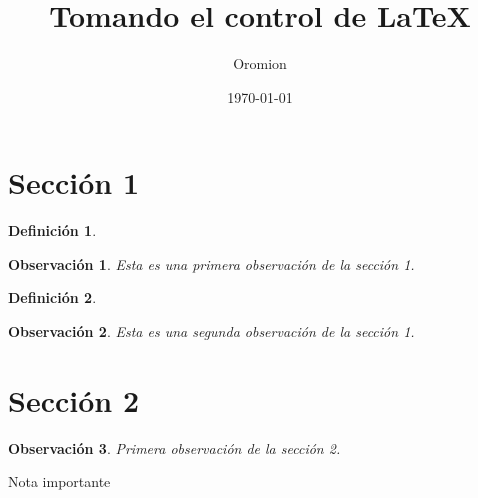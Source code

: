 \documentclass{article}
\title{Tomando el control de \LaTeX{}}
\author{Oromion}
\date{\today}
\newtheorem{definicion}{Definición}
\newtheorem{obs}{Observación}[section] %
\begin{document}
\maketitle

\section{Sección 1}

\lipsum[1]

\begin{definicion}
\lipsum[1]
\end{definicion}

\begin{obs}
Esta es una primera observación de la sección 1.
\end{obs}

\lipsum[1]

\begin{definicion}
\lipsum[1]
\end{definicion}


\begin{obs}
Esta es una segunda observación de la sección 1.
\end{obs}

\section{Sección 2}

\begin{obs}
Primera observación de la sección 2.
\end{obs}

\begin{remark}{Nota importante}
	\lipsum[1]
\end{remark}
\end{document}

